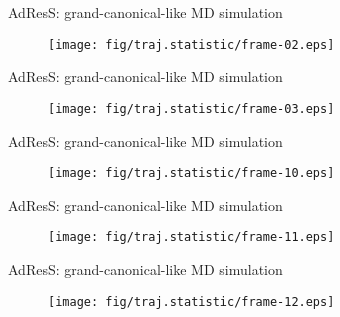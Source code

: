 \documentclass[]{beamer}
\begin{document}
\begin{frame}{AdResS: grand-canonical-like MD simulation}
  \addtocounter{framenumber}{-1}
  \begin{minipage}[t][8cm][t]{1.0\linewidth}
    \begin{figure}[t]
      \centering
      \texttt{[image: fig/traj.statistic/frame-02.eps]}
    \end{figure}
  \end{minipage}
\end{frame}

\begin{frame}{AdResS: grand-canonical-like MD simulation}
  \addtocounter{framenumber}{-1}
  \begin{minipage}[t][8cm][t]{1.0\linewidth}
    \begin{figure}[t]
      \centering
      \texttt{[image: fig/traj.statistic/frame-03.eps]}
    \end{figure}
  \end{minipage}
\end{frame}


\begin{frame}{AdResS: grand-canonical-like MD simulation}
  \addtocounter{framenumber}{-1}
  \begin{minipage}[t][8cm][t]{1.0\linewidth}
    \begin{figure}[t]
      \centering
      \texttt{[image: fig/traj.statistic/frame-10.eps]}
    \end{figure}
  \end{minipage}
\end{frame}

\begin{frame}{AdResS: grand-canonical-like MD simulation}
  \addtocounter{framenumber}{-1}
  \begin{minipage}[t][8cm][t]{1.0\linewidth}
    \begin{figure}[t]
      \centering
      \texttt{[image: fig/traj.statistic/frame-11.eps]}
    \end{figure}
  \end{minipage}
\end{frame}

\begin{frame}{AdResS: grand-canonical-like MD simulation}
  \addtocounter{framenumber}{-1}
  \begin{minipage}[t][8cm][t]{1.0\linewidth}
    \begin{figure}[t]
      \centering
      \texttt{[image: fig/traj.statistic/frame-12.eps]}
    \end{figure}
  \end{minipage}
\end{frame}
\end{document}

